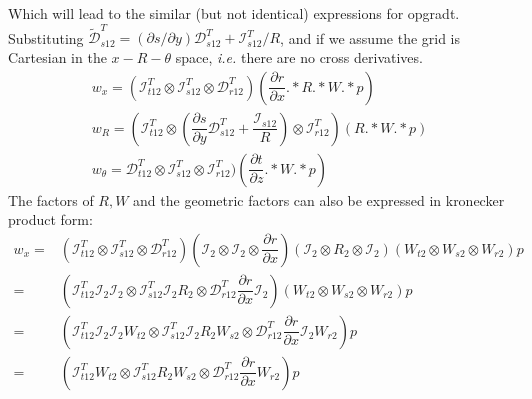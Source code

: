 \documentclass{kthreport}
\begin{document}
Which will lead to the similar (but not identical) expressions for opgradt. Substituting $\widetilde{\mathcal{D}}^{T}_{s12} = (\partial s/\partial y)\mathcal{D}^{T}_{s12} + \mathcal{I}^{T}_{s12}/R$, and if we assume the grid is Cartesian in the $x-R-\theta$ space, \textit{i.e.} there are no cross derivatives.
\begin{subequations}
	\begin{eqnarray}
		w_{x}	= (\mathcal{I}^{T}_{t12}\otimes\mathcal{I}^{T}_{s12}\otimes\mathcal{D}^{T}_{r12})(\dfrac{\partial r}{\partial x}.*R.*W.*p) \\
		w_{R}	= (\mathcal{I}^{T}_{t12}\otimes(\dfrac{\partial s}{\partial y}\mathcal{D}^{T}_{s12} + \dfrac{\mathcal{I}_{s12}}{R})\otimes\mathcal{I}^{T}_{r12})(R.*W.*p) \\
		w_{\theta}	= \mathcal{D}^{T}_{t12}\otimes\mathcal{I}^{T}_{s12}\otimes\mathcal{I}^{T}_{r12})(\dfrac{\partial t}{\partial z}.*W.*p)
	\end{eqnarray}
\end{subequations}
The factors of $R,W$ and the geometric factors can also be expressed in kronecker product form:
\begin{subequations}
	\begin{eqnarray}
		w_{x}	=& (\mathcal{I}^{T}_{t12}\otimes\mathcal{I}^{T}_{s12}\otimes\mathcal{D}^{T}_{r12})(\mathcal{I}_{2}\otimes\mathcal{I}_{2}\otimes\dfrac{\partial r}{\partial x})(\mathcal{I}_{2}\otimes R_{2}\otimes\mathcal{I}_{2})(W_{t2}\otimes W_{s2}\otimes W_{r2})p \\
					  =& (\mathcal{I}^{T}_{t12}\mathcal{I}_{2}\mathcal{I}_{2}\otimes\mathcal{I}^{T}_{s12}\mathcal{I}_{2}R_{2}\otimes\mathcal{D}^{T}_{r12}\dfrac{\partial r}{\partial x}\mathcal{I}_{2})(W_{t2}\otimes W_{s2}\otimes W_{r2})p \\
					  =& (\mathcal{I}^{T}_{t12}\mathcal{I}_{2}\mathcal{I}_{2}W_{t2}\otimes\mathcal{I}^{T}_{s12}\mathcal{I}_{2}R_{2}W_{s2}\otimes\mathcal{D}^{T}_{r12}\dfrac{\partial r}{\partial x}\mathcal{I}_{2}W_{r2})p \\
					  =& (\mathcal{I}^{T}_{t12}W_{t2}\otimes\mathcal{I}^{T}_{s12}R_{2}W_{s2}\otimes\mathcal{D}^{T}_{r12}\dfrac{\partial r}{\partial x}W_{r2})p					  
	\end{eqnarray}
\end{subequations}
\end{document}
